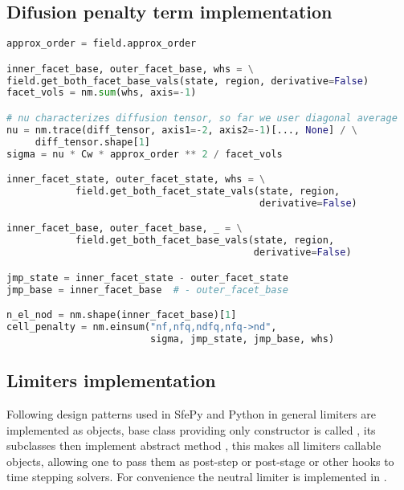 \subsection{Difusion penalty term implementation}
\label{se:diff_penal_term_imp}
\setcounter{lstannotation}{0}
\begin{lstlisting}[language=Python, caption=Computation of penalty cell 
fluxes]
approx_order = field.approx_order

inner_facet_base, outer_facet_base, whs = \
field.get_both_facet_base_vals(state, region, derivative=False)
facet_vols = nm.sum(whs, axis=-1)

# nu characterizes diffusion tensor, so far we user diagonal average
nu = nm.trace(diff_tensor, axis1=-2, axis2=-1)[..., None] / \
     diff_tensor.shape[1]
sigma = nu * Cw * approx_order ** 2 / facet_vols

inner_facet_state, outer_facet_state, whs = \
            field.get_both_facet_state_vals(state, region, 
                                            derivative=False)

inner_facet_base, outer_facet_base, _ = \
            field.get_both_facet_base_vals(state, region, 
                                           derivative=False)

jmp_state = inner_facet_state - outer_facet_state
jmp_base = inner_facet_base  # - outer_facet_base

n_el_nod = nm.shape(inner_facet_base)[1]
cell_penalty = nm.einsum("nf,nfq,ndfq,nfq->nd",
                         sigma, jmp_state, jmp_base, whs)

\end{lstlisting}




\subsection{Limiters implementation}
Following design patterns used in SfePy and Python in general limiters are implemented as objects, base class providing 
only constructor is called , its subclasses then implement abstract 
method , this makes all limiters callable objects, allowing one to pass 
them as post-step or post-stage or other hooks to time stepping solvers. For convenience 
the neutral limiter is implemented in \pysauce{IdentityLimiter}.

